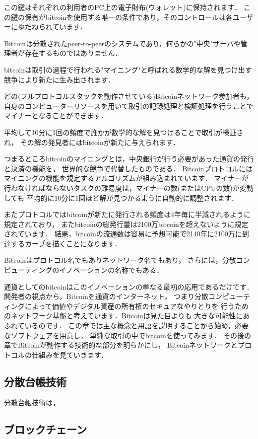 \documentclass[a4paper,12pt]{jsarticle}
\begin{document}
この鍵はそれぞれの利用者のPC上の電子財布(ウォレット)に保持されます．
この鍵の保有がbitcoinを使用する唯一の条件であり，そのコントロールは各ユーザーにゆだねられています．

Bitcoinは分散されたpeer-to-peerのシステムであり，何らかの"中央"サーバや管理者が存在するものではありません．

bitcoinは取引の過程で行われる"マイニング"と呼ばれる数学的な解を見つけ出す競争により新たに生み出されます．

どの(フルプロトコルスタックを動作させている)Bitcoinネットワーク参加者も，
自身のコンピューターリソースを用いて取引の記録処理と検証処理を行うことでマイナーとなることができます．

平均して10分に1回の頻度で誰かが数学的な解を見つけることで取引が検証され，
その解の発見者にはbitcoinが新たに与えられます．

つまるところbitcoinのマイニングとは，中央銀行が行う必要があった通貨の発行と決済の機能を，
世界的な競争で代替したものである．
Bitcoinプロトコルにはマイニングの機能を規定するアルゴリズムが組み込まれています．
マイナーが行わなければならないタスクの難易度は，マイナーの数(またはCPUの数)が変動しても
平均的に10分に1回ほど解が見つかるように自動的に調整されます．

またプロトコルではbitcoinが新たに発行される頻度は4年毎に半減されるように規定されており，
またbitcoinの総発行量は2100万bitcoinを超えないように規定されています．
結果，bitcoinの流通数は容易に予想可能で2140年に2100万に到達するカーブを描くことになります．

Bitcoinはプロトコル名でもありネットワーク名でもあり，
さらには，分散コンピューティングのイノベーションの名称でもある．

通貨としてのbitcoinはこのイノベーションの単なる最初の応用であるだけです．
開発者の視点から，Bitcoinを通貨のインターネット，
つまり分散コンピューティングによって価値やデジタル資産の所有権のセキュアなやりとりを
行うためのネットワーク基盤と考えています．Bitcoinは見た目よりも
大きな可能性にあふれているのです．
この章では主な概念と用語を説明することから始め，必要なソフトウェアを用意し，
単純な取引の中でbitcoinを使ってみます．
その後の章でBitcoinが動作する技術的な部分を明らかにし，
Bitcoinネットワークとプロトコルの仕組みを見ていきます．


      \subsection{分散台帳技術}
分散台帳技術は，

      \subsection{ブロックチェーン}
\end{document}
